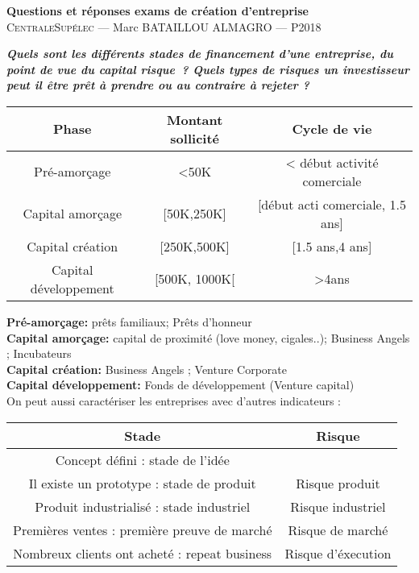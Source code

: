 \documentclass[12pt,oneside,a4paper]{article}
\begin{document}
\begin{center}
{\LARGE \bfseries 
 Questions et réponses exams de création d'entreprise \\[0.3cm] 
}
{\large
  \textsc{CentraleSupélec} --- Marc BATAILLOU ALMAGRO --- P2018\\[0.7cm]
}
\end{center}
  
\textbf{\emph{Quels sont les différents stades de financement d’une entreprise, du point de vue du capital risque ? Quels types de risques un investisseur peut il être prêt à prendre ou au contraire à rejeter ?}}

\vspace{1cm}
\begin{tabular}{|c|c|c|} 
	\hline
	 Phase & Montant sollicité & Cycle de vie\\
	 \hline
	 Pré-amorçage & <50K & < début activité comerciale\\
	 \hline
	 Capital amorçage & [50K,250K] & [début acti comerciale, 1.5 ans]\\
	 \hline
	 Capital création & [250K,500K] & [1.5 ans,4 ans]\\
	 \hline
	 Capital développement & [500K, 1000K[ & >4ans\\
	 \hline
\end{tabular} 
\vspace{1cm}

\noindent
\textbf{Pré-amorçage:} prêts familiaux; Prêts d'honneur \\
\textbf{Capital amorçage:} capital de proximité (love money, cigales..); Business Angels ; Incubateurs\\
\textbf{Capital création: }Business Angels ; Venture Corporate\\
\textbf{Capital développement:} Fonds de développement (Venture capital)\\

On peut aussi caractériser les entreprises avec d'autres indicateurs : 

\vspace{1cm}
\begin{center}
\begin{tabular}{|c|c|}
	\hline
	Stade & Risque\\
	\hline
	Concept défini : stade de l'idée & \\
	\hline
	Il existe un prototype : stade de produit & Risque produit\\
	\hline
	Produit industrialisé : stade industriel & Risque industriel\\
	\hline
	Premières ventes : première preuve de marché & Risque de marché\\
	\hline
	Nombreux clients ont acheté : repeat business & Risque d'éxecution\\
	\hline

\end{tabular}
\end{center}
\vspace{1cm}
\end{document}
